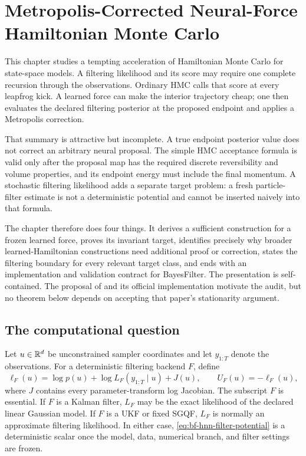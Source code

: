 \chapter[Neural-Force HMC]{Metropolis-Corrected Neural-Force Hamiltonian Monte Carlo}
\label{ch:bf-hnn-surrogate-hmc}

This chapter studies a tempting acceleration of Hamiltonian Monte Carlo for
state-space models.  A filtering likelihood and its score may require one
complete recursion through the observations.  Ordinary HMC calls that score at
every leapfrog kick.  A learned force can make the interior trajectory cheap;
one then evaluates the declared filtering posterior at the proposed endpoint
and applies a Metropolis correction.

That summary is attractive but incomplete.  A true endpoint posterior value
does not correct an arbitrary neural proposal.  The simple HMC acceptance
formula is valid only after the proposal map has the required discrete
reversibility and volume properties, and its endpoint energy must include the
final momentum.  A stochastic filtering likelihood adds a separate target
problem: a fresh particle-filter estimate is not a deterministic potential and
cannot be inserted naively into that formula.

The chapter therefore does four things.  It derives a sufficient construction
for a frozen learned force, proves its invariant target, identifies precisely
why broader learned-Hamiltonian constructions need additional proof or
correction, states the filtering boundary for every relevant target class, and
ends with an implementation and validation contract for BayesFilter.  The
presentation is self-contained.  The proposal of
\citet{dhulipala2022latent} and its official implementation motivate the audit,
but no theorem below depends on accepting that paper's stationarity argument.

\section{The computational question}
\label{sec:bf-hnn-question}

Let $u\in\mathbb{R}^d$ be unconstrained sampler coordinates and let $y_{1:T}$ denote
the observations.  For a deterministic filtering backend $F$, define
\begin{equation}
  \ell_F(u)=\log p(u)+\log L_F(y_{1:T}\mid u)+J(u),
  \qquad U_F(u)=-\ell_F(u),
  \label{eq:bf-hnn-filter-potential}
\end{equation}
where $J$ contains every parameter-transform log Jacobian.  The subscript $F$
is essential.  If $F$ is a Kalman filter, $L_F$ may be the exact likelihood of
the declared linear Gaussian model.  If $F$ is a UKF or fixed SGQF,
$L_F$ is normally an approximate filtering likelihood.  In either case,
\eqref{eq:bf-hnn-filter-potential} is a deterministic scalar once the model,
data, numerical branch, and filter settings are frozen.

